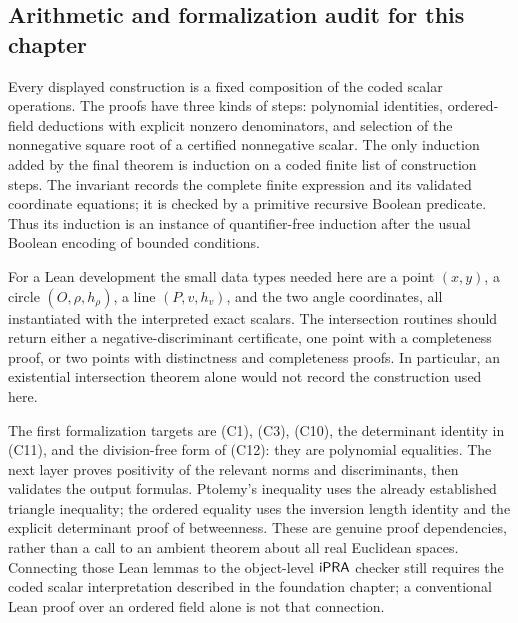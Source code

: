 \subsection{Arithmetic and formalization audit for this chapter}

Every displayed construction is a fixed composition of the coded scalar
operations.  The proofs have three kinds of steps: polynomial identities,
ordered-field deductions with explicit nonzero denominators, and selection
of the nonnegative square root of a certified nonnegative scalar.  The only
induction added by the final theorem is induction on a coded finite list of
construction steps.  The invariant records the complete finite expression
and its validated coordinate equations; it is checked by a primitive
recursive Boolean predicate.  Thus its induction is an instance of
quantifier-free induction after the usual Boolean encoding of bounded
conditions.

For a Lean development the small data types needed here are a point
$(x,y)$, a circle $(O,\rho,h_\rho)$, a line $(P,v,h_v)$, and the two angle
coordinates, all instantiated with the interpreted exact scalars.  The
intersection routines should return either a negative-discriminant
certificate, one point with a completeness proof, or two points with
distinctness and completeness proofs.  In particular, an existential
intersection theorem alone would not record the construction used here.

The first formalization targets are (C1), (C3), (C10), the determinant
identity in (C11), and the division-free form of (C12): they are polynomial
equalities.  The next layer proves positivity of the relevant norms and
discriminants, then validates the output formulas.  Ptolemy's inequality
uses the already established triangle inequality; the ordered equality
uses the inversion length identity and the explicit determinant proof of
betweenness.  These are genuine proof dependencies, rather than a call to
an ambient theorem about all real Euclidean spaces.  Connecting those
Lean lemmas to the object-level $\mathsf{iPRA}$ checker still requires the coded
scalar interpretation described in the foundation chapter; a conventional
Lean proof over an ordered field alone is not that connection.
